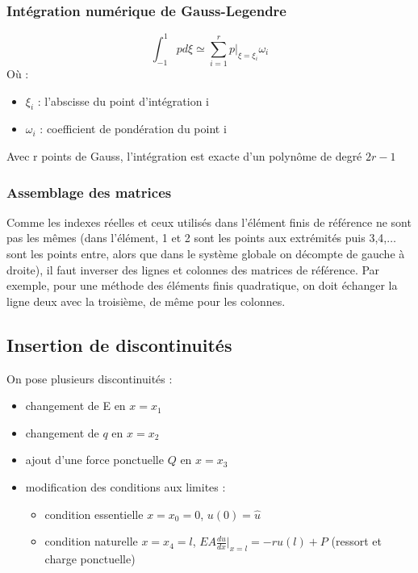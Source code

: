 \documentclass[../main.tex]{subfiles}
\begin{document}
\subsubsection{Intégration numérique de Gauss-Legendre}
\begin{equation}
    \int_{-1}^1 pd\xi \simeq \sum_{i=1}^r p\lvert_{\xi = \xi_i}\omega_i
\end{equation}
Où : \begin{itemize}
    \item $\xi_i$ : l'abscisse du point d'intégration i\\
    \item $\omega_i$ : coefficient de pondération du point i\\
\end{itemize}

\warning Avec r points de Gauss, l'intégration est exacte d'un polynôme de degré $2r-1$\\

\subsubsection{Assemblage des matrices}
Comme les indexes réelles et ceux utilisés dans l'élément finis de référence ne sont pas les mêmes (dans l'élément, 1 et 2 sont les points aux extrémités puis 3,4,$\dots$ sont les points entre, alors que dans le système globale on décompte de gauche à droite), il faut inverser des lignes et colonnes des matrices de référence. Par exemple, pour une méthode des éléments finis quadratique, on doit échanger la ligne deux avec la troisième, de même pour les colonnes.\\

\subsection{Insertion de discontinuités}
On pose plusieurs discontinuités : \begin{itemize}
    \item changement de E en $x=x_1$\\
    \item changement de $q$ en $x=x_2$\\
    \item ajout d'une force ponctuelle $Q$ en $x=x_3$\\
    \item modification des conditions aux limites : \begin{itemize}
        \item condition essentielle $x=x_0=0$, $u(0) = \hat{u}$\\
        \item condition naturelle $x=x_4 = l$, $EA \frac{du}{dx}\lvert_{x=l}= -ru(l)+P$ (ressort et charge ponctuelle)\\
    \end{itemize}
\end{itemize}
\end{document}
